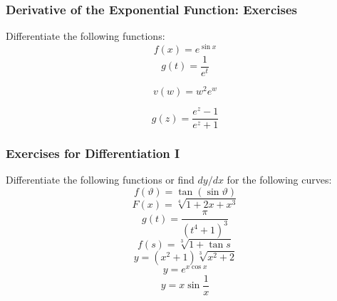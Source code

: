 \documentclass[xcolor=dvipsnames]{beamer}
\begin{document}
\begin{frame}
  \frametitle{Derivative of the Exponential Function: Exercises}
Differentiate the following functions:
\begin{equation}
  \label{eq:beetulae}
f(x)=e^{\sin{}x}  
\end{equation}
\begin{equation}
  \label{eq:aekephii}
g(t)=\frac{1}{e^{t}}  
\end{equation}

\bigskip

\begin{equation}
  \label{eq:uijeabai}
v(w)=w^{2}e^{w}  
\end{equation}

\bigskip

\begin{equation}
  \label{eq:ohzabeed}
g(z)=\frac{e^{z}-1}{e^{z}+1}  
\end{equation}
\end{frame}

\begin{frame}
  \frametitle{Exercises for Differentiation I}
Differentiate the following functions or find $dy/dx$ for the
following curves:
\begin{equation}
  \label{eq:pimexeiz}
  f(\vartheta)=\tan(\sin{}\vartheta)
\end{equation}
\begin{equation}
  \label{eq:oogheica}
  F(x)=\sqrt[4]{1+2x+x^{3}}
\end{equation}
\begin{equation}
  \label{eq:ibagheab}
  g(t)=\frac{\pi}{(t^{4}+1)^{3}}
\end{equation}
\begin{equation}
  \label{eq:oboohoca}
  f(s)=\sqrt[3]{1+\tan{}s}
\end{equation}
\begin{equation}
  \label{eq:choopaib}
  y=(x^{2}+1)\sqrt[3]{x^{2}+2}
\end{equation}
\begin{equation}
  \label{eq:uosiamei}
y=e^{x\cos{}x}  
\end{equation}
\begin{equation}
  \label{eq:oshaiphu}
  y=x\sin\frac{1}{x}
\end{equation}
\end{frame}
\end{document}
